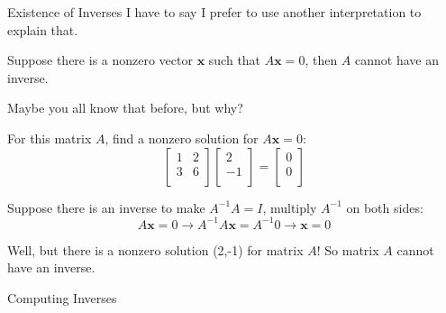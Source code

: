 \documentclass{beamer}
\begin{document}
\begin{frame}{Existence of Inverses}
I have to say I prefer to use another interpretation to explain that.

\begin{theorem}
Suppose there is a nonzero vector $\mathbf{x}$ such that $A\mathbf{x}=0$, then $A$ cannot have an inverse.
\end{theorem}

Maybe you all know that before, but why?

For this matrix $A$, find a nonzero solution for $A\mathbf{x}=0$:
\begin{equation*}
    \left[ \begin{matrix}
        1&		2\\
        3&		6\\
    \end{matrix} \right] \left[ \begin{array}{c}
        2\\
        -1\\
    \end{array} \right] =\left[ \begin{array}{c}
        0\\
        0\\
    \end{array} \right]
\end{equation*}

Suppose there is an inverse to make $A^{-1}A=I$, multiply $A^{-1}$ on both sides:
\begin{equation*}
    A\mathbf{x}=0\rightarrow A^{-1}A\mathbf{x}=A^{-1}0\rightarrow \mathbf{x}=0
\end{equation*}

Well, but there is a nonzero solution (2,-1) for matrix $A$! So matrix $A$ cannot have an inverse.
\end{frame}

\begin{frame}{Computing Inverses}
    
\end{frame}
\end{document}
